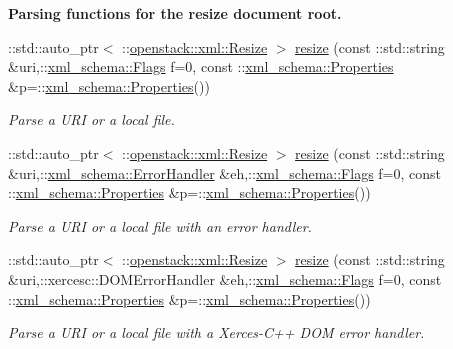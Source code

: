 \begin{Indent}{\bf Parsing functions for the resize document root.}\par
\begin{DoxyCompactItemize}
\item 
::std::auto\_\-ptr$<$ ::\hyperlink{classopenstack_1_1xml_1_1Resize}{openstack::xml::Resize} $>$ \hyperlink{namespaceopenstack_1_1xml_aa1455c09190ef56ad49904dafa349507}{resize} (const ::std::string \&uri,::\hyperlink{namespacexml__schema_affb4c227cbd9aa7453dd1dc5a1401943}{xml\_\-schema::Flags} f=0, const ::\hyperlink{namespacexml__schema_ad27ce19a7ee1d3b1064092648898f64c}{xml\_\-schema::Properties} \&p=::\hyperlink{namespacexml__schema_ad27ce19a7ee1d3b1064092648898f64c}{xml\_\-schema::Properties}())
\begin{DoxyCompactList}\small\item\em Parse a URI or a local file. \item\end{DoxyCompactList}\item 
::std::auto\_\-ptr$<$ ::\hyperlink{classopenstack_1_1xml_1_1Resize}{openstack::xml::Resize} $>$ \hyperlink{namespaceopenstack_1_1xml_ad9e64a2d885cc310098c06f442e118bb}{resize} (const ::std::string \&uri,::\hyperlink{namespacexml__schema_ab1c9361bfd3b404eaabf0c31eded79dc}{xml\_\-schema::ErrorHandler} \&eh,::\hyperlink{namespacexml__schema_affb4c227cbd9aa7453dd1dc5a1401943}{xml\_\-schema::Flags} f=0, const ::\hyperlink{namespacexml__schema_ad27ce19a7ee1d3b1064092648898f64c}{xml\_\-schema::Properties} \&p=::\hyperlink{namespacexml__schema_ad27ce19a7ee1d3b1064092648898f64c}{xml\_\-schema::Properties}())
\begin{DoxyCompactList}\small\item\em Parse a URI or a local file with an error handler. \item\end{DoxyCompactList}\item 
::std::auto\_\-ptr$<$ ::\hyperlink{classopenstack_1_1xml_1_1Resize}{openstack::xml::Resize} $>$ \hyperlink{namespaceopenstack_1_1xml_a576d06575e455bd3902a3ef28c9d0fbc}{resize} (const ::std::string \&uri,::xercesc::DOMErrorHandler \&eh,::\hyperlink{namespacexml__schema_affb4c227cbd9aa7453dd1dc5a1401943}{xml\_\-schema::Flags} f=0, const ::\hyperlink{namespacexml__schema_ad27ce19a7ee1d3b1064092648898f64c}{xml\_\-schema::Properties} \&p=::\hyperlink{namespacexml__schema_ad27ce19a7ee1d3b1064092648898f64c}{xml\_\-schema::Properties}())
\begin{DoxyCompactList}\small\item\em Parse a URI or a local file with a Xerces-\/C++ DOM error handler. \item\end{DoxyCompactList}\item 

\end{DoxyCompactItemize}
\end{Indent}
